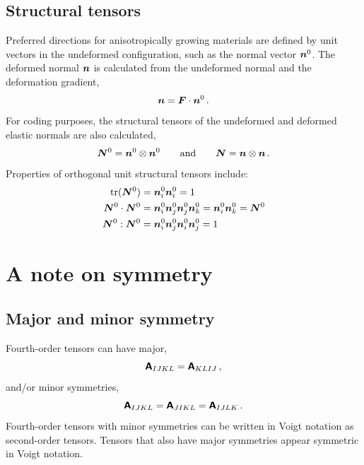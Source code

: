 \documentclass[10pt,letterpaper,oneside]{report}
\newcommand{\ten}[1]{\mbox{\boldmath $#1$}{}}
\newcommand{\tenf}[1]{\mbox{{\sffamily{\bfseries {#1}}}}}
\begin{document}
\section{Structural tensors}\label{sec:structural}
Preferred directions for anisotropically growing materials are defined by unit vectors in the undeformed configuration, such as the normal vector $\ten{n}^0$.  The deformed normal $\ten{n}$ is calculated from the undeformed normal and the deformation gradient,
\begin{equation}
\ten{n} = \ten{F} \cdot \ten{n}^0 \, .
\end{equation}
For coding purposes, the structural tensors of the undeformed and deformed elastic normals are also calculated, 
\begin{equation}
\ten{N}^0 = \ten{n}^0 \otimes \ten{n}^0 
\qquad \text{and} \qquad 
\ten{N} = \ten{n} \otimes \ten{n} \, .
\end{equation}
Properties of orthogonal unit structural tensors include:
\begin{align}
\text{tr} (\ten{N}^0) ={}& \ten{n}^0_i \ten{n}^0_i = 1 \\
\ten{N}^0 \cdot \ten{N}^0 ={}& \ten{n}^0_i \ten{n}^0_j \ten{n}^0_j \ten{n}^0_k = \ten{n}^0_i \ten{n}^0_k = \ten{N}^0 \\
\ten{N}^0 : \ten{N}^0 ={}& \ten{n}^0_i \ten{n}^0_j \ten{n}^0_i \ten{n}^0_j = 1
\end{align}

\chapter{A note on symmetry}
\label{sec:symmetry}

\section{Major and minor symmetry}
Fourth-order tensors can have major, 
\begin{equation}
\tenf{A}_{IJKL} = \tenf{A}_{KLIJ} \, , 
\end{equation}
and/or minor symmetries, 
\begin{equation}
\tenf{A}_{IJKL} = \tenf{A}_{JIKL} = \tenf{A}_{IJLK} \, .
\end{equation}
Fourth-order tensors with minor symmetries can be written in Voigt notation as second-order tensors.  Tensors that also have major symmetries appear symmetric in Voigt notation.  
\end{document}
